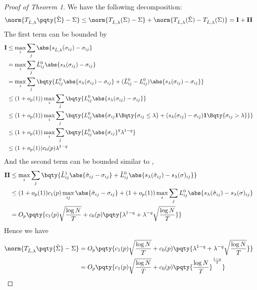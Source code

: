 \begin{proof}[Proof of Theorem 1]
    We have the following decomposition:
    \begin{equation*}
        \norm{T_{\hat{L},\lambda}\pqty{\hat{\Sigma}} - \Sigma } \leq \norm{T_{\hat{L} ,\lambda}(\Sigma) - \Sigma} +\norm{T_{\hat{L}, \lambda}(\hat{\Sigma}) - T_{\hat{L},\lambda}(\Sigma)} = \mathbf{I} + \mathbf{II}
    \end{equation*}
    The first term can be bounded by 
    \begin{align*}
        \mathbf{I} &\leq \max_{i} \sum_{j} \abs{s_{\hat{L}, \lambda}(\sigma_{ij}) - \sigma_{ij}} \\
        &= \max_{i} \sum_{j} \hat{L}_{ij}^{0} \abs{s_{\lambda}(\sigma_{ij}) - \sigma_{ij}}\\
        &= \max_{i} \sum_{j} \bqty{L_{ij}^{0} \abs{s_{\lambda}(\sigma_{ij}) - \sigma_{ij}} + (\hat{L}_{ij}^{0} - L_{ij}^{0})\abs{s_{\lambda}(\sigma_{ij}) - \sigma_{ij}}} \\
        &\leq (1 + o_{p}(1))\max_{i} \sum_{j} \bqty{L_{ij}^{0} \abs{s_{\lambda}(\sigma_{ij}) - \sigma_{ij}}}\\
        &\leq (1 + o_{p}(1))\max_{i} \sum_{j} \bqty{L_{ij}^{0} \abs{\sigma_{ij} \mathbf{1}\Bqty{\sigma_{ij}\leq \lambda} + (s_{\lambda}(\sigma_{ij}) - \sigma_{ij}) \mathbf{1}\Bqty{\sigma_{ij} > \lambda}}}\\
        &\leq (1 + o_{p}(1)) \max_{i} \sum_{j} \bqty{L_{ij}^{0}\abs{\sigma_{ij}}^{q} \lambda^{1 -q}}\\
        &\leq (1 + o_{p}(1)) c_{0}(p) \lambda^{1-q}
    \end{align*}
    And the second term can be bounded similar to \cite{rothman2009GeneralizedThresholding}, 
    \begin{align*}
        \mathbf{II} &\leq  \max_{i} \sum_{j} \bqty{\hat{L}_{ij}^{1} \abs{\hat{\sigma}_{ij} - \sigma_{ij}} + \hat{L}_{ij}^{0} \abs{s_{\lambda}(\hat{\sigma}_{ij}) - s_{\lambda} (\sigma)_{ij}}}\\
        &\leq (1 + o_{p}(1))c_{1}(p)\max_{ij} \abs{\hat{\sigma}_{ij} - \sigma_{ij}} + (1 + o_{p}(1)) \max_{i} \sum_{j} L_{ij}^{0} \abs{s_{\lambda}(\hat{\sigma}_{ij}) - s_{\lambda} (\sigma)_{ij}} \\
        &= O_{p}\pqty{c_{1}(p) \sqrt{\frac{\log N}{T}} + c_{0}(p) \pqty{\lambda^{1-q} + \lambda^{-q} \sqrt{\frac{\log N}{T}}}} \\
    \end{align*}
    Hence we have 
    \begin{align*}
        \norm{T_{\hat{L},\lambda}\pqty{\hat{\Sigma}} - \Sigma } &= O_{p}\pqty{c_{1}(p) \sqrt{\frac{\log N}{T}} + c_{0}(p) \pqty{\lambda^{1-q} + \lambda^{-q} \sqrt{\frac{\log N}{T}}}} \\
        &= O_{p}\pqty{c_{1}(p) \sqrt{\frac{\log N}{T}} + c_{0}(p)\pqty{\frac{\log N}{T}}^{\frac{1-q}{2}}}
    \end{align*}
\end{proof}

